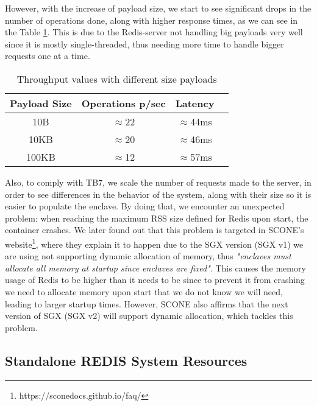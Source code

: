 However, with the increase of payload size, we start to see significant drops in the number of operations done, along with higher response times, as we can see in the Table \ref{table:throughputPayloads}. This is due to the Redis-server not handling big payloads very well since it is mostly single-threaded, thus needing more time to handle bigger requests one at a time.

\begin{table}[ht]
	\caption{Throughput values with different size payloads} %
	\centering %
	\begin{tabular}{c c c c} %
		\hline\hline %
		\textbf{Payload Size} & \textbf{Operations p/sec} & \textbf{Latency}\\ [0.5ex] %
		\hline
		10B & $\approx$22 & $\approx$44ms\\
		\hline
		10KB & $\approx$20 & $\approx$46ms\\
		\hline %
		100KB & $\approx$12 & $\approx$57ms\\ [1ex] %
		\hline %
	\end{tabular}
	\label{table:throughputPayloads} %
\end{table} 

Also, to comply with TB7, we scale the number of requests made to the server, in order to see differences in the behavior of the system, along with their size so it is easier to populate the enclave. By doing that, we encounter an unexpected problem: when reaching the maximum RSS size defined for Redis upon start, the container crashes. We later found out that this problem is targeted in SCONE's website\footnote{https://sconedocs.github.io/faq/}, where they explain it to happen due to the SGX version (SGX v1) we are using not supporting dynamic allocation of memory, thus \textit{"enclaves must allocate all memory at startup since enclaves are fixed"}. This causes the memory usage of Redis to be higher than it needs to be since to prevent it from crashing we need to allocate memory upon start that we do not know we will need, leading to larger startup times. However, SCONE also affirms that the next version of SGX (SGX v2) will support dynamic allocation, which tackles this problem. 


\subsection{Standalone REDIS System Resources}
\label{ssec:SingleRedis_MemCPU}


